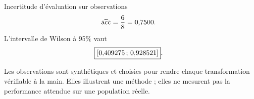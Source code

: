\begin{frame}[t]{Incertitude d'évaluation sur \MicroNTest{} observations}
  \vspace{3mm}
  \[
    \widehat{\mathrm{acc}}
      =\frac{6}{8}=0{,}7500.
  \]
  L'intervalle de Wilson à 95\% vaut
  \[
    \boxed{[0{,}409275\,;\,0{,}928521]}.
  \]
  \begin{vigilance}
    Les \MicroTotalStudents{} observations sont synthétiques et choisies pour
    rendre chaque transformation vérifiable à la main. Elles illustrent une
    méthode ; elles ne mesurent pas la performance attendue sur une population
    réelle.
  \end{vigilance}
\end{frame}
